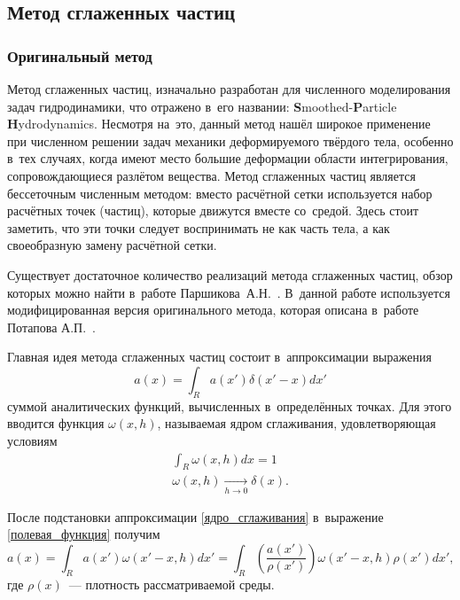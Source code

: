 \documentclass[thesis.tex]{subfiles}
\begin{document}
\subsection{Метод сглаженных частиц}
\label{раздел:метод-сглаженных-частиц}

\subsubsection{Оригинальный метод}

Метод сглаженных частиц, изначально разработан \cite{monaghan1988introduction} для численного моделирования задач
гидродинамики, что отражено в~его названии: \textbf{S}moothed-\textbf{P}article \textbf{H}ydrodynamics. Несмотря на~это,
данный метод нашёл широкое применение при численном решении задач механики деформируемого твёрдого тела, особенно в~тех
случаях, когда имеют место большие деформации области интегрирования, сопровождающиеся разлётом вещества. Метод
сглаженных частиц является бессеточным численным методом: вместо расчётной сетки используется набор расчётных точек
(частиц), которые движутся вместе со~средой. Здесь стоит заметить, что эти точки следует воспринимать не как часть тела,
а как своеобразную замену расчётной сетки.

Существует достаточное количество реализаций метода сглаженных частиц, обзор которых можно найти в~работе
Паршикова~А.Н.~\cite{паршиков2013диссертация}. В~данной работе используется модифицированная версия оригинального метода, которая
описана в~работе Потапова А.П.~\cite{потапов2009диссертация}.

Главная идея метода сглаженных частиц состоит в~аппроксимации выражения
\begin{equation}
    a(x)=\int_R a(x')\delta(x'-x)dx'
    \label{полевая_функция}
\end{equation}
суммой аналитических функций, вычисленных в~определённых точках. Для этого вводится функция $\omega(x,h)$, называемая
ядром сглаживания, удовлетворяющая условиям
\begin{align}
    \int_R\omega(x,h)dx=1 \label{ядро_сглаживания} \\
    \omega(x,h) \xrightarrow[h \to 0]{} \delta(x). \nonumber
\end{align}

После подстановки аппроксимации \ref{ядро_сглаживания} в~выражение \ref{полевая_функция} получим
\[
    a(x) = \int_R a(x')\omega(x'-x,h)dx'=\int_R \left(  \frac{a(x')}{\rho(x')} \right) \omega(x'-x,h)\rho(x')dx',
\]
где $\rho(x)$~--- плотность рассматриваемой среды.
\end{document}
